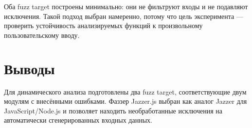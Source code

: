 Оба fuzz target построены минимально: они не фильтруют входы и не подавляют
исключения. Такой подход выбран намеренно, потому что цель эксперимента ---
проверить устойчивость анализируемых функций к произвольному пользовательскому
вводу.

\section{Выводы} \label{ch1:conclusion}

Для динамического анализа подготовлены два fuzz target, соответствующие двум
модулям с внесёнными ошибками. Фаззер Jazzer.js выбран как аналог Jazzer для
JavaScript/Node.js и позволяет находить необработанные исключения на автоматически
сгенерированных входных данных.

